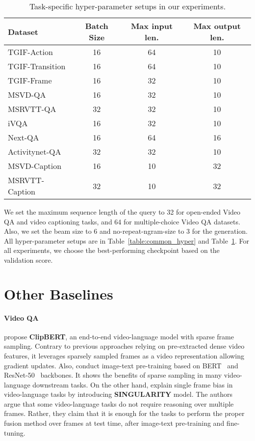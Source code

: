 \documentclass{article}
\begin{document}
\begin{table}[t!]
    \centering
    \small
    \caption{Task-specific hyper-parameter setups in our experiments.}
    \vskip 0.15in
\begin{adjustbox}{width=0.48\textwidth} 
    \begin{tabular}{lccc}
        \toprule
        Dataset & Batch Size & Max input len. & Max output len. \\
        \midrule
        TGIF-Action & 16 & 64 & 10 \\
        TGIF-Transition & 16 & 64 & 10 \\
        TGIF-Frame & 16 & 32 & 10 \\
        MSVD-QA & 16 & 32 & 10 \\
        MSRVTT-QA & 32 & 32 & 10 \\
        iVQA & 16 & 32 & 10 \\
        Next-QA & 16 & 64 & 16 \\
        Activitynet-QA & 32 & 32 & 10 \\
        \midrule
        MSVD-Caption & 16 & 10 & 32 \\
        MSRVTT-Caption & 32 & 10 & 32 \\
        \bottomrule
    \end{tabular}
    \end{adjustbox}
\label{table:specific_hyper}
\end{table} 
We set the maximum sequence length of the query to 32 for open-ended Video QA and video captioning tasks, and 64 for multiple-choice Video QA datasets. Also, we set the beam size to 6 and no-repeat-ngram-size to 3 for the generation. All hyper-parameter setups are in Table~\ref{table:common_hyper} and Table~\ref{table:specific_hyper}.
For all experiments, we choose the best-performing checkpoint based on the validation score. 


\section{Other Baselines}
\label{appendix:baseline}

\paragraph{Video QA}

\citet{lei2021less} propose \textbf{ClipBERT}, an end-to-end video-language model with sparse frame sampling. Contrary to previous approaches relying on pre-extracted dense video features, it leverages sparsely sampled frames as a video representation allowing gradient updates. Also, \citet{lei2021less} conduct image-text pre-training based on BERT~\cite{devlin2019bert} and ResNet-50~\cite{he2016deep} backbones. It shows the benefits of sparse sampling in many video-language downstream tasks. On the other hand, \citet{lei2022revealing} explain single frame bias in video-language tasks by introducing \textbf{SINGULARITY} model. The authors argue that some video-language tasks do not require reasoning over multiple frames. Rather, they claim that it is enough for the tasks to perform the proper fusion method over frames at test time, after image-text pre-training and fine-tuning.
\end{document}
